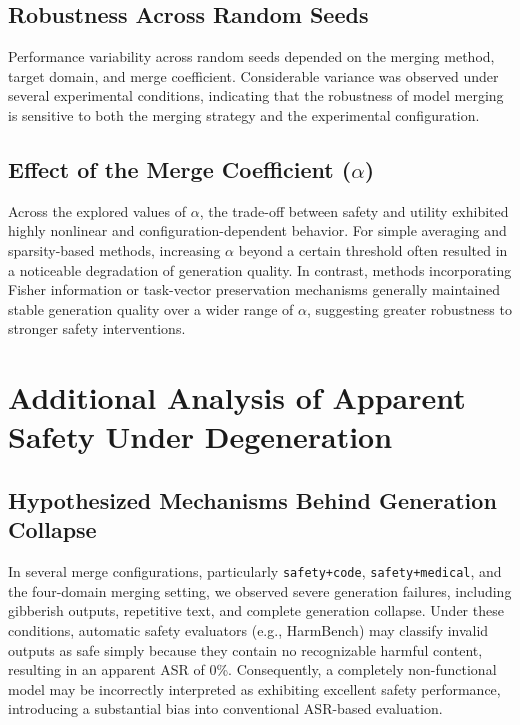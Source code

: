 \documentclass{article}
\begin{document}
\FloatBarrier
\subsection{Robustness Across Random Seeds}

Performance variability across random seeds depended on the merging method, target domain, and merge coefficient. Considerable variance was observed under several experimental conditions, indicating that the robustness of model merging is sensitive to both the merging strategy and the experimental configuration.

\subsection{Effect of the Merge Coefficient ($\alpha$)}

Across the explored values of $\alpha$, the trade-off between safety and utility exhibited highly nonlinear and configuration-dependent behavior. For simple averaging and sparsity-based methods, increasing $\alpha$ beyond a certain threshold often resulted in a noticeable degradation of generation quality. In contrast, methods incorporating Fisher information or task-vector preservation mechanisms generally maintained stable generation quality over a wider range of $\alpha$, suggesting greater robustness to stronger safety interventions.

\section{Additional Analysis of Apparent Safety Under Degeneration}
\label{app:偽の安全性の追加分析}


\subsection{Hypothesized Mechanisms Behind Generation Collapse}

In several merge configurations, particularly \texttt{safety+code}, \texttt{safety+medical}, and the four-domain merging setting, we observed severe generation failures, including gibberish outputs, repetitive text, and complete generation collapse. Under these conditions, automatic safety evaluators (e.g., HarmBench) may classify invalid outputs as safe simply because they contain no recognizable harmful content, resulting in an apparent ASR of 0\%. Consequently, a completely non-functional model may be incorrectly interpreted as exhibiting excellent safety performance, introducing a substantial bias into conventional ASR-based evaluation.
\end{document}
